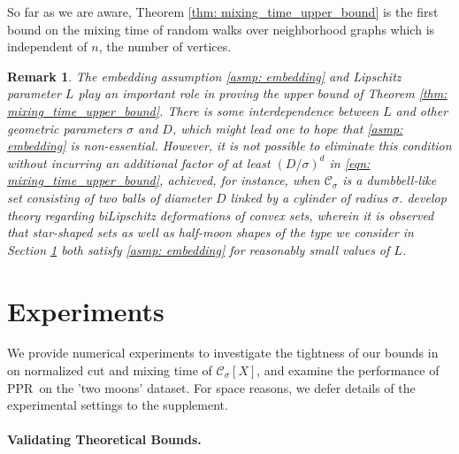 \documentclass{article}
\newcommand{\1}{\mathbf{1}}
\newcommand{\Xbf}{X}             %
\newcommand{\Cset}{\mathcal{C}}
\newcommand{\Csig}{\Cset_{\sigma}}
\newcommand{\pprspace}{{\sc PPR~}}
\theoremstyle{aldenthm}
\theoremstyle{aldenrmrk}
\newtheorem{remark}{Remark}
\begin{document}
So far as we are aware, Theorem \ref{thm: mixing_time_upper_bound} is the first bound on the mixing time of random walks over neighborhood graphs which is independent of $n$, the number of vertices.
\begin{remark}
	The embedding assumption \ref{asmp: embedding} and Lipschitz parameter $L$ play an important role in proving the upper bound of Theorem \ref{thm: mixing_time_upper_bound}. There is some interdependence between $L$ and other geometric parameters $\sigma$ and $D$, which might lead one to hope that \ref{asmp: embedding} is non-essential. However, it is not possible to eliminate this condition without incurring an additional factor of at least $(D/\sigma)^d$ in \eqref{eqn: mixing_time_upper_bound}, achieved, for instance, when $\Csig$ is a dumbbell-like set consisting of two balls of diameter $D$ linked by a cylinder of radius $\sigma$.  \citep{abbasi-yadkori2016, abbasi-yadkori2016a} develop theory regarding biLipschitz deformations of convex sets, wherein it is observed that star-shaped sets as well as half-moon shapes of the type we consider in Section \ref{sec: experiments} both satisfy \ref{asmp: embedding} for reasonably small values of $L$.
\end{remark}

\section{Experiments}
\label{sec: experiments}

We provide numerical experiments to investigate the tightness of our bounds in on normalized cut and mixing time of $\Csig[\Xbf]$, and examine the performance of \pprspace on the 'two moons' dataset. For space reasons, we defer details of the experimental settings to the supplement.

\paragraph{Validating Theoretical Bounds.}
\end{document}
